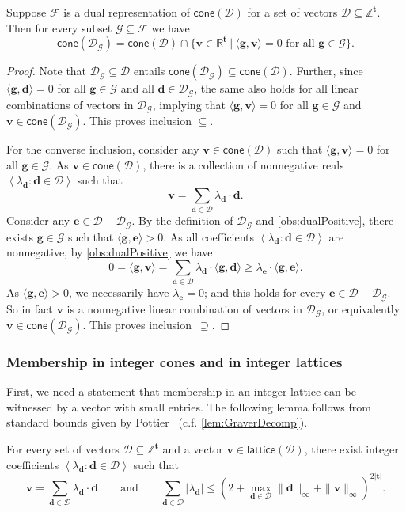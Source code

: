 \documentclass{theoretics}
\renewcommand{\leq}{\leqslant}
\renewcommand{\geq}{\geqslant}
\newcommand{\Dd}{\mathcal{D}}
\newcommand{\Z}{\mathbb{Z}}
\newcommand{\R}{\mathbb{R}}
\newcommand{\tup}[1]{{\mathbf{#1}}}
\newcommand{\tv}{\tup t}
\renewcommand{\gg}{\tup g}
\newcommand{\dd}{\tup d}
\newcommand{\ee}{\tup e}
\newcommand{\myvv}{\tup v} %
\newcommand{\mset}[1]{\left\langle #1\right\rangle}
\newcommand{\Ff}{\mathcal{F}}
\newcommand{\Gg}{\mathcal{G}}
\newcommand{\sca}[2]{\langle #1,#2\rangle}
\renewcommand{\setminus}{-}
\newcommand{\realcone}{\mathsf{cone}}
\newcommand{\lattice}{\mathsf{lattice}}
\begin{document}
\begin{lemma}\label{lem:facetRepresentation}
 Suppose $\Ff$ is a dual representation of $\realcone(\Dd)$ for a set of vectors $\Dd\subseteq \Z^\tv$. Then for every subset $\Gg\subseteq \Ff$ we have
 $$\realcone(\Dd_\Gg) = \realcone(\Dd)\cap \{\myvv\in \R^{\tv}~|~\sca{\gg}{\myvv}=0\textrm{ for all }\gg\in \Gg\}.$$
\end{lemma}
\begin{proof}
 Note that $\Dd_\Gg\subseteq \Dd$ entails $\realcone(\Dd_\Gg)\subseteq \realcone(\Dd)$. Further, since $\sca{\gg}{\dd}=0$ for all $\gg\in \Gg$ and all $\dd\in \Dd_\Gg$, the same also holds for all linear combinations of vectors in $\Dd_\Gg$, implying that $\sca{\gg}{\myvv}=0$ for all $\gg\in \Gg$ and $\myvv\in \realcone(\Dd_\Gg)$. This proves inclusion $\subseteq$.

 For the converse inclusion, consider any $\myvv\in \realcone(\Dd)$ such that $\sca{\gg}{\myvv}=0$ for all $\gg\in \Gg$. As $\myvv\in \realcone(\Dd)$, there is a collection of nonnegative reals $\mset{\lambda_\dd\colon \dd\in \Dd}$ such that
 $$\myvv = \sum_{\dd\in \Dd} \lambda_\dd\cdot \dd.$$
 Consider any $\ee\in \Dd\setminus \Dd_\Gg$. By the definition of $\Dd_\Gg$ and \cref{obs:dualPositive}, there exists $\gg\in \Gg$ such that $\sca{\gg}{\ee}>0$. As all coefficients $\mset{\lambda_\dd\colon \dd\in \Dd}$ are nonnegative, by \cref{obs:dualPositive} we have
 $$0=\sca{\gg}{\myvv}=\sum_{\dd\in \Dd} \lambda_\dd\cdot \sca{\gg}{\dd} \geq \lambda_\ee\cdot \sca{\gg}{\ee}.$$
 As $\sca{\gg}{\ee}>0$, we necessarily have $\lambda_\ee=0$; and this holds for every $\ee\in \Dd\setminus \Dd_\Gg$. So in fact $\myvv$ is a nonnegative linear combination of vectors in $\Dd_\Gg$, or equivalently $\myvv\in \realcone(\Dd_\Gg)$. This proves inclusion~$\supseteq$.
\end{proof}

\subsubsection{Membership in integer cones and in integer lattices}

First, we need a statement that membership in an integer lattice can be witnessed by a vector with small entries. The following lemma follows from standard bounds given by Pottier~\cite[Corollary~4]{Pottier91} (c.f. \cref{lem:GraverDecomp}).

\begin{lemma}\label{lem:latticeSmallSol}
For every set of vectors $\Dd\subseteq \Z^\tv$ and a vector $\myvv\in \lattice(\Dd)$, there exist integer coefficients $\mset{\lambda_\dd\colon \dd\in \Dd}$ such that
$$\myvv=\sum_{\dd\in \Dd} \lambda_\dd\cdot \dd\qquad \textrm{and}\qquad \sum_{\dd\in \Dd} |\lambda_\dd|\leq \left(2+\max_{\dd\in \Dd} \|\dd\|_\infty+\|\myvv\|_\infty\right)^{2|\tv|}.$$
\end{lemma}
\end{document}
